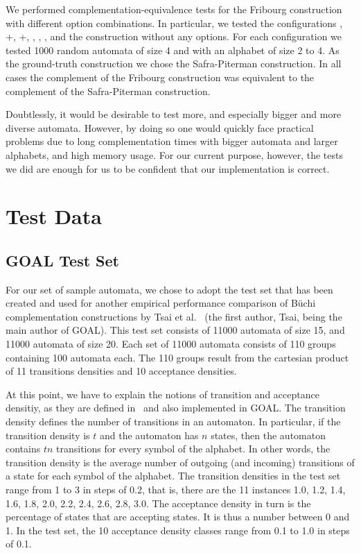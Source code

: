 We performed complementation-equivalence tests for the Fribourg construction with different option combinations. In particular, we tested the configurations , +, +, , , , and the construction without any options. For each configuration we tested 1000 random automata of size 4 and with an alphabet of size 2 to 4. As the ground-truth construction we chose the Safra-Piterman construction. In all cases the complement of the Fribourg construction was equivalent to the complement of the Safra-Piterman construction.

Doubtlessly, it would be desirable to test more, and especially bigger and more diverse automata. However, by doing so one would quickly face practical problems due to long complementation times with bigger automata and larger alphabets, and high memory usage. For our current purpose, however, the tests we did are enough for us to be confident that our implementation is correct.

\section{Test Data}

\subsection{GOAL Test Set}
For our set of sample automata, we chose to adopt the test set that has been created and used for another empirical performance comparison of Büchi complementation constructions by Tsai et al.~\cite{2010_tsai} (the first author, Tsai, being the main author of GOAL). This test set consists of 11000 automata of size 15, and 11000 automata of size 20. Each set of 11000 automata consists of 110 groups containing 100 automata each. The 110 groups result from the cartesian product of 11 transitions densities and 10 acceptance densities.

At this point, we have to explain the notions of transition and acceptance densitiy, as they are defined in~\cite{2010_tsai} and also implemented in GOAL. The transition density defines the number of transitions in an automaton. In particular, if the transition density is $t$ and the automaton has $n$ states, then the automaton contains $tn$ transitions for every symbol of the alphabet. In other words, the transition density is the average number of outgoing (and incoming) transitions of a state for each symbol of the alphabet. The transition densities in the test set range from 1 to 3 in steps of 0.2, that is, there are the 11 instances 1.0, 1.2, 1.4, 1.6, 1.8, 2.0, 2.2, 2.4, 2.6, 2.8, 3.0. The acceptance density in turn is the percentage of states that are accepting states. It is thus a number between 0 and 1. In the test set, the 10 acceptance density classes range from 0.1 to 1.0 in steps of 0.1.

